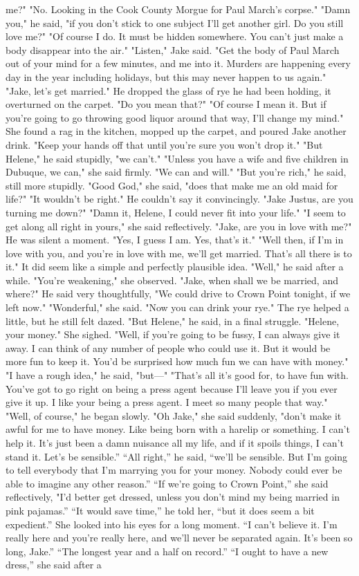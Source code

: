 \documentclass{novel}
\begin{document}
me?" "No. Looking in the Cook County Morgue for Paul March's corpse." "Damn you," he said, "if you don't stick to one subject I'll get another girl. Do you still love me?" "Of course I do. It must be hidden somewhere. You can't just make a body disappear into the air." "Listen," Jake said. "Get the body of Paul March out of your mind for a few minutes, and me into it. Murders are happening every day in the year including holidays, but this may never happen to us again." "Jake, let's get married." He dropped the glass of rye he had been holding, it overturned on the carpet. "Do you mean that?" "Of course I mean it. But if you're going to go throwing good liquor around that way, I'll change my mind." She found a rag in the kitchen, mopped up the carpet, and poured Jake another drink. "Keep your hands off that until you're sure you won't drop it." "But Helene," he said stupidly, "we can't." "Unless you have a wife and five children in Dubuque, we can," she said firmly. "We can and will." "But you're rich," he said, still more stupidly. "Good God," she said, "does that make me an old maid for life?" "It wouldn't be right." He couldn't say it convincingly. "Jake Justus, are you turning me down?" "Damn it, Helene, I could never fit into your life." "I seem to get along all right in yours," she said reflectively. "Jake, are you in love with me?" He was silent a moment. "Yes, I guess I am. Yes, that's it." "Well then, if I'm in love with you, and you're in love with me, we'll get married. That's all there is to it." It did seem like a simple and perfectly plausible idea. "Well," he said after a while. "You're weakening," she observed. "Jake, when shall we be married, and where?" He said very thoughtfully, "We could drive to Crown Point tonight, if we left now." "Wonderful," she said. "Now you can drink your rye." The rye helped a little, but he still felt dazed. "But Helene," he said, in a final struggle. "Helene, your money." She sighed. "Well, if you're going to be fussy, I can always give it away. I can think of any number of people who could use it. But it would be more fun to keep it. You'd be surprised how much fun we can have with money." "I have a rough idea," he said, "but—" "That's all it's good for, to have fun with. You've got to go right on being a press agent because I'll leave you if you ever give it up. I like your being a press agent. I meet so many people that way." "Well, of course," he began slowly. "Oh Jake," she said suddenly, "don't make it awful for me to have money. Like being born with a harelip or something. I can't help it. It’s just been a damn nuisance all my life, and if it spoils things, I can’t stand it. Let’s be sensible.” “All right,” he said, “we’ll be sensible. But I’m going to tell everybody that I'm marrying you for your money. Nobody could ever be able to imagine any other reason.” “If we’re going to Crown Point,” she said reflectively, "I'd better get dressed, unless you don’t mind my being married in pink pajamas.” “It would save time,” he told her, “but it does seem a bit expedient.” She looked into his eyes for a long moment. “I can’t believe it. I'm really here and you’re really here, and we’ll never be separated again. It’s been so long, Jake.” “The longest year and a half on record.” “I ought to have a new dress,” she said after a 
\end{document}
